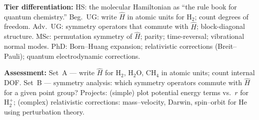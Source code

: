 \documentclass[11pt,a4paper]{article}
\begin{document}
\begin{tcolorbox}[chembox, title={Module~III.1 --- Lecture L01: The Molecular Hamiltonian}]
\medskip\textbf{Tier differentiation:}
HS: the molecular Hamiltonian as ``the rule book for quantum chemistry.''
Beg.\ UG: write $\hat{H}$ in atomic units for H$_2$; count degrees of freedom.
Adv.\ UG: symmetry operators that commute with $\hat{H}$; block-diagonal structure.
MSc: permutation symmetry of $\hat{H}$; parity; time-reversal; vibrational normal modes.
PhD: Born--Huang expansion; relativistic corrections (Breit--Pauli); quantum electrodynamic corrections.

\medskip\textbf{Assessment:}
Set~A --- write $\hat{H}$ for H$_2$, H$_2$O, CH$_4$ in atomic units; count internal DOF.
Set~B --- symmetry analysis: which symmetry operators commute with $\hat{H}$ for a given point group?
Projects: (simple) plot potential energy terms vs.\ $r$ for H$_2^+$; (complex) relativistic corrections: mass--velocity, Darwin, spin--orbit for He using perturbation theory.
\end{tcolorbox}

\medskip
\end{document}
